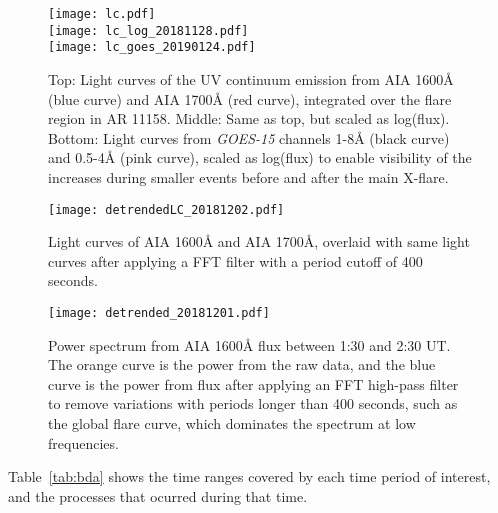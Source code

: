 \clearpage
\begin{figure*}[htb!]\centering
    \texttt{[image: lc.pdf]}\\
    \texttt{[image: lc\_log\_20181128.pdf]}\\
    \texttt{[image: lc\_goes\_20190124.pdf]}
    \caption{%
        Top: Light curves of the
        UV continuum emission from AIA 1600\AA{} (blue curve) and
        AIA 1700\AA{} (red curve),
        integrated over the flare region in AR 11158.
        Middle: Same as top, but scaled as log(flux).
        Bottom: Light curves from \textit{GOES-15}
        channels 1-8\AA{} (black curve) and 0.5-4\AA{} (pink curve),
        scaled as log(flux) to enable visibility of the increases
        during smaller events before and
        after the main X-flare.
        \label{lc}}
\end{figure*}


\clearpage
\begin{figure}[htb!]\centering
    \texttt{[image: detrendedLC\_20181202.pdf]}
    \caption{%
        Light curves of AIA 1600\AA{} and AIA 1700\AA{}, overlaid with
        same light curves after applying a FFT filter with a period
        cutoff of 400 seconds.
    \label{detrended}}
\end{figure}


\begin{figure}[htb!]\centering
    \texttt{[image: detrended\_20181201.pdf]}
    \caption{%
        Power spectrum from
        AIA 1600\AA{} flux between 1:30 and 2:30 UT.
        The orange curve is the power from the raw data, and the blue
        curve is the power from flux after applying an FFT high-pass filter
        to remove variations with periods longer than 400 seconds,
        such as the global flare curve, which dominates the spectrum at
        low frequencies.
    \label{detrended2}}
\end{figure}




Table~\ref{tab:bda} shows the time ranges covered by each time period
of interest, and the processes that ocurred during that time.

